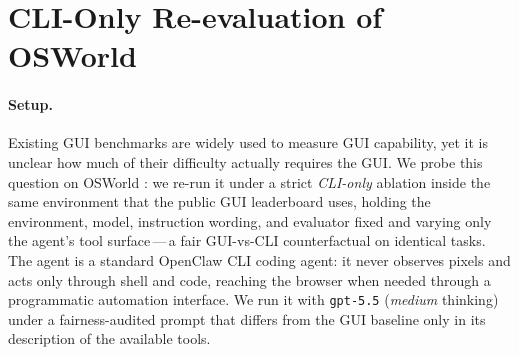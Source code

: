
\newcommand{\cliOswN}{362}
\newcommand{\cliOswIntent}{79.1}
\newcommand{\cuaVisionIntent}{77.3}
\newcommand{\cuaVisionNative}{64.3}
\newcommand{\cliOswSteps}{14.3}
\newcommand{\cuaVisionSteps}{29.0}

\FloatBarrier
\section{CLI-Only Re-evaluation of OSWorld}
\label{app:cli-osworld}

\paragraph{Setup.}
Existing GUI benchmarks are widely used to measure GUI capability, yet it is
unclear how much of their difficulty actually requires the GUI. We probe this
question on OSWorld \citep{xie2024osworld}: we re-run it under a strict
\emph{CLI-only} ablation inside the same environment that the public GUI
leaderboard uses, holding the environment, model, instruction wording, and
evaluator fixed and varying only the agent's tool surface\,---\,a fair
GUI-vs-CLI counterfactual on identical tasks. The agent is a standard
OpenClaw CLI coding agent: it never observes pixels and acts only through
shell and code, reaching the browser when needed through a programmatic
automation interface. We run it with \texttt{gpt-5.5} (\emph{medium}
thinking) under a fairness-audited prompt that differs from the GUI baseline
only in its description of the available tools.


